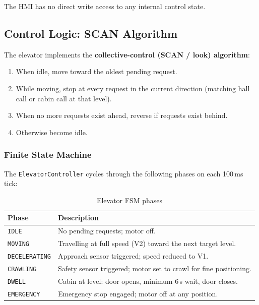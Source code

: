 \documentclass[12pt,a4paper]{article}
\begin{document}
The HMI has no direct write access to any internal control state.

\subsection{Control Logic: SCAN Algorithm}

The elevator implements the \textbf{collective-control (SCAN / look) algorithm}:

\begin{enumerate}
    \item When idle, move toward the oldest pending request.
    \item While moving, stop at every request in the current direction
          (matching hall call or cabin call at that level).
    \item When no more requests exist ahead, reverse if requests exist behind.
    \item Otherwise become idle.
\end{enumerate}

\subsubsection{Finite State Machine}

The \texttt{ElevatorController} cycles through the following phases on each
100\,ms tick:

\begin{table}[H]
\centering
\begin{tabularx}{\textwidth}{lX}
\toprule
\textbf{Phase} & \textbf{Description} \\
\midrule
\texttt{IDLE}         & No pending requests; motor off. \\
\texttt{MOVING}       & Travelling at full speed (V2) toward the next target level. \\
\texttt{DECELERATING} & Approach sensor triggered; speed reduced to V1. \\
\texttt{CRAWLING}     & Safety sensor triggered; motor set to crawl for fine positioning. \\
\texttt{DWELL}        & Cabin at level: door opens, minimum 6\,s wait, door closes. \\
\texttt{EMERGENCY}    & Emergency stop engaged; motor off at any position. \\
\bottomrule
\end{tabularx}
\caption{Elevator FSM phases}
\end{table}
\end{document}
